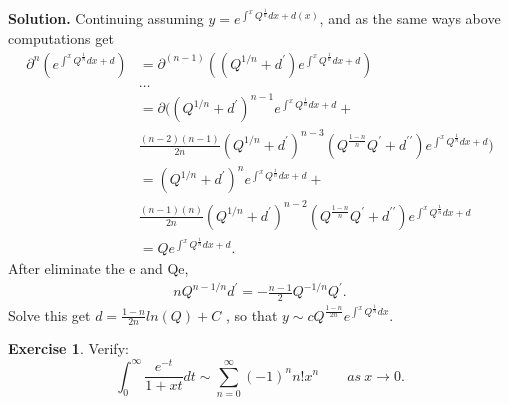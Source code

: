 \documentclass[a4paper]{book}
\newenvironment{solution}%
{\noindent\textbf{Solution.}}%
{\qedhere}
\numberwithin{equation}{chapter}
\theoremstyle{definition}
\newtheorem{exc}[exm]{Exercise}
\begin{document}
\begin{multicols}{2}
\begin{solution}
	Continuing assuming $ y = e^{ \int^x Q^{\frac{1}{n}}dx + d(x)} $, and as the same ways above computations get 
	\begin{equation}
		\begin{aligned}
			\partial^n (e^{\int^x Q^{\frac{1}{n}}dx + d}) &= \partial^(n-1) ((Q^{1/n} + d^\prime) e^{\int^x Q^{\frac{1}{n}}dx + d}) \\
			&\dots \\
			&=\partial ((Q^{1/n} + d^\prime)^{n-1} e^{\int^x Q^{\frac{1}{n}}dx + d}  +\\
			&\frac{(n-2)(n-1)}{2n}(Q^{1/n} + d^\prime)^{n-3}(Q^{\frac{1-n}{n}}Q^\prime  + d^{\prime \prime})  e^{\int^x Q^{\frac{1}{n}}dx + d}) \\
			&= (Q^{1/n} + d^\prime)^{n} e^{\int^x Q^{\frac{1}{n}}dx + d} + \\ 
			&\frac{(n-1)(n)}{2n}(Q^{1/n} + d^\prime)^{n-2}(Q^{\frac{1-n}{n}}Q^\prime  + d^{\prime \prime})  e^{\int^x Q^{\frac{1}{n}}dx + d} \\
			&= Q  e^{\int^x Q^{\frac{1}{n}}dx + d}.		
		\end{aligned}
	\end{equation}
	After eliminate the e and Qe,
	\begin{equation}
		\begin{aligned}
		n Q^{n-1/n} d^\prime = -\frac{n-1}{2} Q^{-1/n} Q^\prime.
		\end{aligned}
	\end{equation}
	Solve this get $ d = \frac{1-n}{2n} ln(Q) + C$ , so that  $ y \sim c Q^{\frac{1-n}{2n}}e^{\int^x Q^{\frac{1}{n}}dx} $.
\end{solution}

\begin{exc}
	Verify: 
	\begin{equation}\label{1:3:1}
		\int_{0}^{\infty} \frac{e^{-t}}{1+xt} dt \sim \sum_{n=0}^{\infty}(-1)^n n! x^n \qquad as \ x \rightarrow 0 .
	\end{equation}
\end{exc}


\end{multicols}
\end{document}
